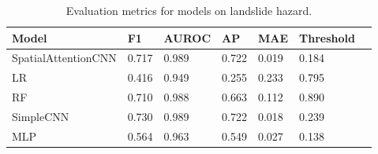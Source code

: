 \begin{table}[h!]
    \centering
    \begin{tabularx}{0.8\textwidth}{@{}lXXXXXX@{}}
    \toprule
    \textbf{Model} & \textbf{F1} & \textbf{AUROC} & \textbf{AP} & \textbf{MAE} & \textbf{Threshold} \\
    \midrule
    SpatialAttentionCNN & 0.717 & 0.989 & 0.722 & 0.019 & 0.184 \\
    LR & 0.416 & 0.949 & 0.255 & 0.233 & 0.795 \\
    RF & 0.710 & 0.988 & 0.663 & 0.112 & 0.890 \\
    SimpleCNN & 0.730 & 0.989 & 0.722 & 0.018 & 0.239 \\
    MLP & 0.564 & 0.963 & 0.549 & 0.027 & 0.138 \\
    \bottomrule
    \end{tabularx}
    \caption{Evaluation metrics for models on landslide hazard.}
    \label{tab:evaluation_metrics}
\end{table}
